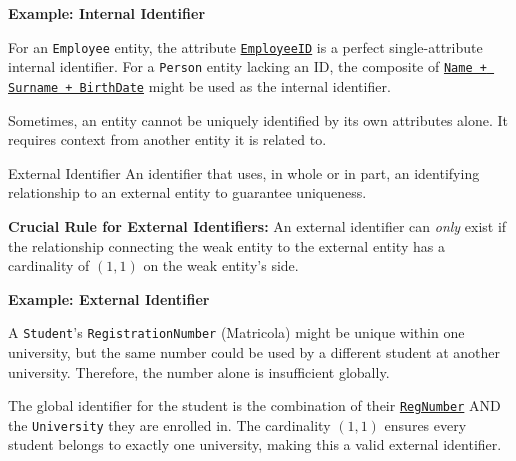 \vspace{0.2cm}
\begin{example}{\textbf{Example: Internal Identifier}}

For an \texttt{Employee} entity, the attribute \underline{\texttt{EmployeeID}} is a perfect single-attribute internal identifier. For a \texttt{Person} entity lacking an ID, the composite of \underline{\texttt{Name + Surname + BirthDate}} might be used as the internal identifier.
\end{example}


Sometimes, an entity cannot be uniquely identified by its own attributes alone. It requires context from another entity it is related to.

\begin{defbox}{External Identifier}
An identifier that uses, in whole or in part, an identifying relationship to an external entity to guarantee uniqueness. 
\end{defbox}

\textbf{Crucial Rule for External Identifiers:}
 An external identifier can \textit{only} exist if the relationship connecting the weak entity to the external entity has a cardinality of $(1,1)$ on the weak entity's side.

\vspace{0.2cm}
\begin{example}{\textbf{Example: External Identifier}}
    
A \texttt{Student}'s \texttt{RegistrationNumber} (Matricola) might be unique within one university, but the same number could be used by a different student at another university. Therefore, the number alone is insufficient globally.

\vspace{0.2cm}
\begin{center}
\end{center}

\vs
The global identifier for the student is the combination of their \underline{\texttt{RegNumber}} AND the \texttt{University} they are enrolled in. The cardinality $(1,1)$ ensures every student belongs to exactly one university, making this a valid external identifier.
\end{example}